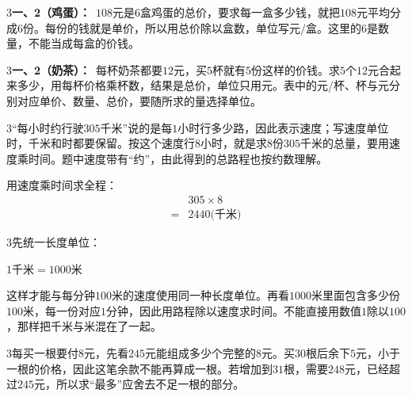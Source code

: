 \documentclass[multi=snippet,border={5bp 20bp 5bp 5bp}]{standalone}
\newenvironment{snippet}[3]{\begin{minipage}{#1bp}\color{answerred}\fontsize{#2}{#3}\selectfont\raggedright}{\end{minipage}}
\begin{document}
\begin{snippet}{505}{11.5}{14}\begin{multicols}{3}\raggedcolumns \textbf{一、2（鸡蛋）：}\ \(108\)\allowbreak 元是\(6\)\allowbreak 盒鸡蛋的总价，要求每一盒多少钱，就把\(108\)\allowbreak 元平均分成\(6\)\allowbreak 份。每份的钱就是单价，所以用总价除以盒数，单位写元/盒。这里的\(6\)\allowbreak 是数量，不能当成每盒的价钱。\end{multicols}\end{snippet}
\begin{snippet}{505}{11.5}{14}\begin{multicols}{3}\raggedcolumns \textbf{一、2（奶茶）：}\ 每杯奶茶都要\(12\)\allowbreak 元，买\(5\)\allowbreak 杯就有\(5\)\allowbreak 份这样的价钱。求\(5\)\allowbreak 个\(12\)\allowbreak 元合起来多少，用每杯价格乘杯数，结果是总价，单位只用元。表中的元/杯、杯与元分别对应单价、数量、总价，要随所求的量选择单位。\end{multicols}\end{snippet}
\begin{snippet}{505}{11.5}{14}\begin{multicols}{3}\raggedcolumns “每小时约行驶\(305\)\allowbreak 千米”说的是每\(1\)\allowbreak 小时行多少路，因此表示速度；写速度单位时，千米和时都要保留。按这个速度行\(8\)\allowbreak 小时，就是求\(8\)\allowbreak 份\(305\)\allowbreak 千米的总量，要用速度乘时间。题中速度带有“约”，由此得到的总路程也按约数理解。\par 用速度乘时间求全程：\[\begin{aligned}&305\times8\\={}&2440\text{(千米)}\end{aligned}\]\end{multicols}\end{snippet}
\begin{snippet}{505}{11.5}{14}\begin{multicols}{3}\raggedcolumns 先统一长度单位：\par\noindent\(\displaystyle 1\text{千米}=1000\text{米}\)\allowbreak \par 这样才能与每分钟\(100\)\allowbreak 米的速度使用同一种长度单位。再看\(1000\)\allowbreak 米里面包含多少份\(100\)\allowbreak 米，每一份对应\(1\)\allowbreak 分钟，因此用路程除以速度求时间。不能直接用数值\(1\)\allowbreak 除以\(100\)\allowbreak ，那样把千米与米混在了一起。\end{multicols}\end{snippet}
\begin{snippet}{505}{11.5}{14}\begin{multicols}{3}\raggedcolumns 每买一根要付\(8\)\allowbreak 元，先看\(245\)\allowbreak 元能组成多少个完整的\(8\)\allowbreak 元。买\(30\)\allowbreak 根后余下\(5\)\allowbreak 元，小于一根的价格，因此这笔余款不能再算成一根。若增加到\(31\)\allowbreak 根，需要\(248\)\allowbreak 元，已经超过\(245\)\allowbreak 元，所以求“最多”应舍去不足一根的部分。\end{multicols}\end{snippet}
\end{document}
